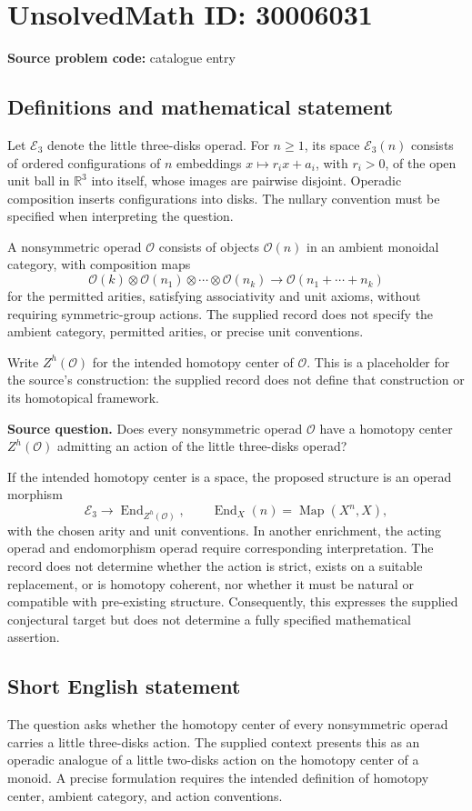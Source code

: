 \documentclass[11pt]{article}
\newcommand{\R}{\mathbb{R}}
\begin{document}
\section*{UnsolvedMath ID: 30006031}
\textbf{Source problem code:} catalogue entry
\subsection{Definitions and mathematical statement}
Let \(\mathcal E_3\) denote the little three-disks operad. For \(n\geq 1\), its space \(\mathcal E_3(n)\) consists of ordered configurations of \(n\) embeddings \(x\mapsto r_i x+a_i\), with \(r_i>0\), of the open unit ball in \(\R^3\) into itself, whose images are pairwise disjoint. Operadic composition inserts configurations into disks. The nullary convention must be specified when interpreting the question.

A nonsymmetric operad \(\mathcal O\) consists of objects \(\mathcal O(n)\) in an ambient monoidal category, with composition maps
\[
\mathcal O(k)\otimes\mathcal O(n_1)\otimes\cdots\otimes\mathcal O(n_k)
\longrightarrow \mathcal O(n_1+\cdots+n_k)
\]
for the permitted arities, satisfying associativity and unit axioms, without requiring symmetric-group actions. The supplied record does not specify the ambient category, permitted arities, or precise unit conventions.

Write \(Z^h(\mathcal O)\) for the intended homotopy center of \(\mathcal O\). This is a placeholder for the source's construction: the supplied record does not define that construction or its homotopical framework.

\textbf{Source question.} Does every nonsymmetric operad \(\mathcal O\) have a homotopy center \(Z^h(\mathcal O)\) admitting an action of the little three-disks operad?

If the intended homotopy center is a space, the proposed structure is an operad morphism
\[
\mathcal E_3\longrightarrow \operatorname{End}_{Z^h(\mathcal O)},
\qquad
\operatorname{End}_{X}(n)=\operatorname{Map}(X^n,X),
\]
with the chosen arity and unit conventions. In another enrichment, the acting operad and endomorphism operad require corresponding interpretation. The record does not determine whether the action is strict, exists on a suitable replacement, or is homotopy coherent, nor whether it must be natural or compatible with pre-existing structure. Consequently, this expresses the supplied conjectural target but does not determine a fully specified mathematical assertion.
\subsection{Short English statement}
The question asks whether the homotopy center of every nonsymmetric operad carries a little three-disks action. The supplied context presents this as an operadic analogue of a little two-disks action on the homotopy center of a monoid. A precise formulation requires the intended definition of homotopy center, ambient category, and action conventions.
\end{document}
